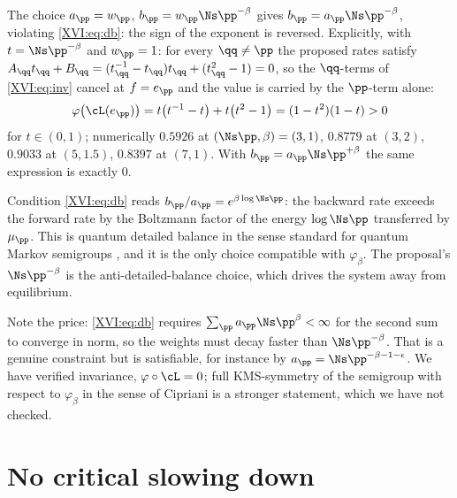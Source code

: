 \begin{corollary}\label{XVI:cor:signerror}
The choice $a_\pp=w_\pp$, $b_\pp=w_\pp\Ns\pp^{-\beta}$ gives
$b_\pp=a_\pp\Ns\pp^{-\beta}$, violating \eqref{XVI:eq:db}: the sign of the exponent is
reversed. Explicitly, with $t=\Ns\pp^{-\beta}$ and $w_\pp=1$: for every $\qq\ne\pp$ the
proposed rates satisfy $A_\qq t_\qq+B_\qq=(t_\qq^{-1}-t_\qq)t_\qq+(t_\qq^2-1)=0$, so the
$\qq$-terms of \eqref{XVI:eq:inv} cancel at $f=e_\pp$ and the value is carried by the
$\pp$-term alone:
\[
\varphi\bigl(\cL(e_\pp)\bigr)=t\bigl(t^{-1}-t\bigr)+t\bigl(t^2-1\bigr)=(1-t^2)(1-t)>0
\]
for $t\in(0,1)$; numerically $0.5926$ at $(\Ns\pp,\beta)=(3,1)$, $0.8779$ at $(3,2)$,
$0.9033$ at $(5,1.5)$, $0.8397$ at $(7,1)$. With $b_\pp=a_\pp\Ns\pp^{+\beta}$ the same
expression is exactly $0$.
\end{corollary}

\begin{remark}\label{XVI:rem:dbmeaning}
Condition \eqref{XVI:eq:db} reads $b_\pp/a_\pp=e^{\beta\log\Ns\pp}$: the backward rate exceeds
the forward rate by the Boltzmann factor of the energy $\log\Ns\pp$ transferred by
$\mu_\pp$. This is quantum detailed balance in the sense standard for quantum Markov
semigroups \cite{CarlenMaas}, and it is the only choice compatible with
$\varphi_\beta$. The proposal's $\Ns\pp^{-\beta}$ is the anti-detailed-balance choice, which
drives the system away from equilibrium.

Note the price: \eqref{XVI:eq:db} requires $\sum_\pp a_\pp\Ns\pp^{\beta}<\infty$ for the second
sum to converge in norm, so the weights must decay faster than $\Ns\pp^{-\beta}$. That is a
genuine constraint but is satisfiable, for instance by $a_\pp=\Ns\pp^{-\beta-1-\epsilon}$.
We have verified invariance, $\varphi\circ\cL=0$; full KMS-symmetry of the semigroup with
respect to $\varphi_\beta$ in the sense of Cipriani \cite{Cipriani} is a stronger statement,
which we have not checked.
\end{remark}

\section{No critical slowing down}

